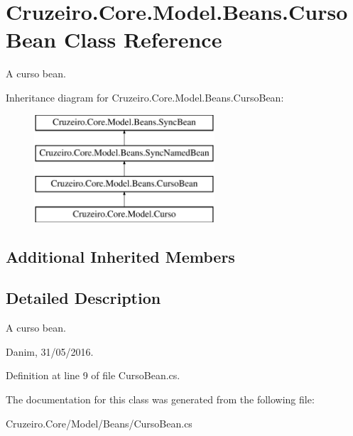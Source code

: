 \hypertarget{class_cruzeiro_1_1_core_1_1_model_1_1_beans_1_1_curso_bean}{}\section{Cruzeiro.\+Core.\+Model.\+Beans.\+Curso\+Bean Class Reference}
\label{class_cruzeiro_1_1_core_1_1_model_1_1_beans_1_1_curso_bean}


A curso bean.  


Inheritance diagram for Cruzeiro.\+Core.\+Model.\+Beans.\+Curso\+Bean\+:\begin{figure}[H]
\begin{center}
\leavevmode
\includegraphics[height=4.000000cm]{class_cruzeiro_1_1_core_1_1_model_1_1_beans_1_1_curso_bean}
\end{center}
\end{figure}
\subsection*{Additional Inherited Members}


\subsection{Detailed Description}
A curso bean. 

Danim, 31/05/2016. 

Definition at line 9 of file Curso\+Bean.\+cs.



The documentation for this class was generated from the following file\+:\begin{DoxyCompactItemize}
\item 
Cruzeiro.\+Core/\+Model/\+Beans/Curso\+Bean.\+cs\end{DoxyCompactItemize}
